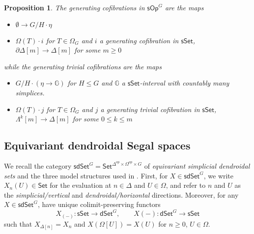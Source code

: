 \documentclass[a4paper,10pt
,draft
]{article}%
\numberwithin{equation}{section}
\numberwithin{figure}{section}
\newtheorem{proposition}[equation]{Proposition}%
\theoremstyle{definition} %
\newcommand{\Set}{\ensuremath{\mathsf{Set}}}
\newcommand{\sSet}{\ensuremath{\mathsf{sSet}}}%
\newcommand{\dSet}{\mathsf{dSet}}
\newcommand{\F}{\ensuremath{\mathcal F}}
\newcommand{\1}{\ensuremath{\mathbbm 1}}%
\begin{document}
\begin{proposition}
      The generating cofibrations in $\mathsf{sOp}^G$
      are the maps
      \begin{itemize}
      \item[(OC1)] $\emptyset \to G/H \cdot \eta$ %
      \item[(OC2)] $\Omega(T) \cdot i$ for $T \in \Omega_G$
            and $i$ a generating cofibration in $\sSet$, $\partial \Delta[m] \to \Delta[m]$ for some $m \geq 0$
      \end{itemize}
      while the generating trivial cofibrations are the maps 
      \begin{itemize}
      \item[(OA1)] 
            $G/H \cdot \left(\eta \to \mathbb{G}\right)$ %
            for $H \leq G$ and $\mathbb G$ a $\sSet$-interval with countably many simplices.
      \item[(OA2)] 
            $\Omega(T) \cdot j$ for $T \in \Omega_G$
            and $j$ a generating trivial cofibration in $\sSet$, $\Lambda^k[m] \to \Delta[m]$ for some $0 \leq k \leq m$ %
      \end{itemize}
\end{proposition}













\subsection{Equivariant dendroidal Segal spaces}
\label{JT_SEC}

We recall the category $\mathsf{sdSet}^G = \Set^{\Delta^{op} \times \Omega^{op} \times G}$ of \textit{equivariant simplicial dendroidal sets} and the three model structures used in \cite{BP_edss}.
First, for $X \in \mathsf{sdSet}^G$, we write $X_n(U) \in \Set$ for the evaluation at $n \in \Delta$ and $U \in \Omega$,
and refer to $n$ and $U$ as the \textit{simplicial/vertical} and \textit{dendroidal/horizontal} directions.
Moreover, for any $X \in \mathsf{sdSet}^G$, have unique colimit-preserving functors
\begin{equation}
      \label{SDSET_EQ}
      X_{(-)} \colon \sSet \to \dSet^G,
      \qquad
      X(-) \colon \dSet^G \to \sSet
\end{equation}
such that $X_{\Delta[n]} = X_n$ and $X(\Omega[U]) = X(U)$ for $n \geq 0$, $U \in \Omega$.
\end{document}
